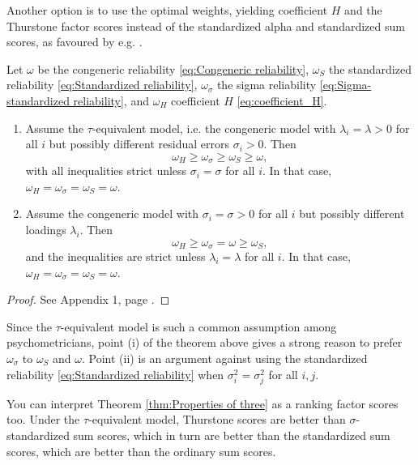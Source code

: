 \documentclass[twoside]{article}
\begin{document}
Another option is to use the optimal weights, yielding coefficient $H$ and the Thurstone factor scores instead of the standardized alpha and standardized sum scores, as favoured by e.g. \citet{McNeish2019-ea}.

\begin{thm}
\label{thm:Properties of three} Let $\omega$ be the congeneric
reliability \eqref{eq:Congeneric reliability}, $\omega_{S}$ the standardized reliability \eqref{eq:Standardized reliability},
$\omega_{\sigma}$ the sigma reliability \eqref{eq:Sigma-standardized reliability},
and $\omega_{H}$ coefficient $H$ \eqref{eq:coefficient_H}. 

\begin{enumerate}[label=(\roman*)]
\item Assume the $\tau$-equivalent model,
i.e. the congeneric model with $\lambda_{i}=\lambda>0$ for all $i$
but possibly different residual errors $\sigma_{i}>0$. Then
\[
\omega_{H}\geq\omega_{\sigma}\geq\omega_{S}\geq\omega,
\]
with all inequalities strict unless $\sigma_{i}=\sigma$ for all
$i$. In that case, $\omega_{H} = \omega_{\sigma} = \omega_{S} = \omega$.
\item Assume the congeneric model with $\sigma_i = \sigma > 0$ for all $i$ but possibly different loadings $\lambda_i$. Then
\[
\omega_{H}\geq\omega_{\sigma}=\omega\geq\omega_{S},
\]
and the inequalities are strict unless $\lambda_{i}=\lambda$ for all
$i$. In that case, $\omega_{H} = \omega_{\sigma} = \omega_{S} = \omega$.

\end{enumerate}

\end{thm}
\begin{proof}
See Appendix 1, page \pageref{proof:Properties}.
\end{proof}

Since the $\tau$-equivalent model is such a common assumption among psychometricians, point (i) of the theorem above gives a strong reason to prefer $\omega_{\sigma}$ to $\omega_S$ and $\omega$. Point (ii) is an argument against using the standardized reliability \eqref{eq:Standardized reliability} when $\sigma_{i}^{2}=\sigma_j^{2}$ for all $i,j$.

You can interpret Theorem \ref{thm:Properties of three} as a ranking factor scores too. Under the $\tau$-equivalent model, Thurstone scores are better than $\sigma$-standardized sum scores, which in turn are better than the standardized sum scores, which are
better than the ordinary sum scores.
\end{document}
